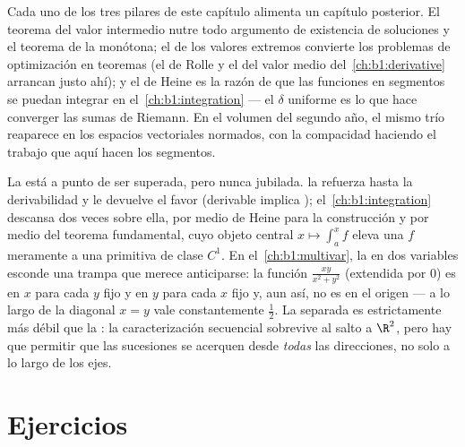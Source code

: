 \begin{remark}
Cada uno de los tres pilares de este capítulo alimenta un capítulo
posterior. El teorema del valor intermedio nutre todo argumento de
existencia de soluciones y el teorema de la  monótona; el de
los valores extremos convierte los problemas de optimización en
teoremas (el de Rolle y el del valor medio del~\cref{ch:b1:derivative}
arrancan justo ahí); y el de Heine es la razón de que las funciones
 en segmentos se puedan integrar en
el~\cref{ch:b1:integration} --- el $\delta$ uniforme es lo que hace
converger las sumas de Riemann. En el volumen del segundo año, el
mismo trío reaparece en los espacios vectoriales normados, con la
compacidad haciendo el trabajo que aquí hacen los segmentos.
\end{remark}

\begin{remark}
La  está a punto de ser superada, pero nunca jubilada.
 la refuerza hasta la derivabilidad y le
devuelve el favor (derivable implica );
el~\cref{ch:b1:integration} descansa dos veces sobre ella, por medio
de Heine para la construcción y por medio del teorema fundamental,
cuyo objeto central $x \mapsto \int_a^x f$ eleva una $f$ meramente
 a una primitiva de clase $C^1$. En
el~\cref{ch:b1:multivar}, la  en dos variables esconde una
trampa que merece anticiparse: la función $\frac{xy}{x^2 + y^2}$
(extendida por $0$) es  en $x$ para cada $y$ fijo y en $y$
para cada $x$ fijo y, aun así, no es  en el origen --- a lo
largo de la diagonal $x = y$ vale constantemente $\frac12$. La
 separada es estrictamente más débil que la
: la caracterización secuencial sobrevive al salto a
$\R^2$, pero hay que permitir que las sucesiones se acerquen desde
\emph{todas} las direcciones, no solo a lo largo de los ejes.
\end{remark}

\section{Ejercicios}

